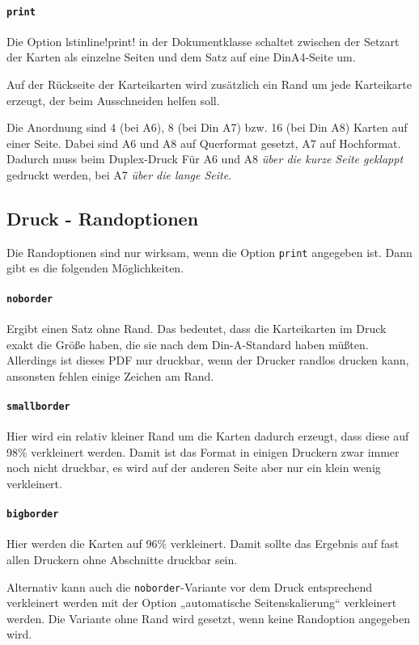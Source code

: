 \documentclass[a4paper]{article}
\begin{document}
\paragraph{\lstinline!print!} Die Option lstinline!print! in der Dokumentklasse schaltet zwischen der Setzart der Karten als einzelne Seiten und dem Satz auf eine DinA4-Seite um.

Auf der Rückseite der Karteikarten wird zusätzlich ein Rand um jede Karteikarte erzeugt, der beim Ausschneiden helfen soll.

Die Anordnung sind 4 (bei A6), 8 (bei Din A7) bzw. 16 (bei Din A8) Karten auf einer Seite. Dabei sind A6 und A8 auf Querformat gesetzt, A7 auf Hochformat. Dadurch muss beim Duplex-Druck Für A6 und A8 \emph{über die kurze Seite geklappt} gedruckt werden, bei A7 \emph{über die lange Seite}.
\subsection{Druck - Randoptionen}
Die Randoptionen sind nur wirksam, wenn die Option \lstinline!print! angegeben ist. Dann gibt es die folgenden Möglichkeiten. 
\paragraph{\lstinline!noborder!} Ergibt einen Satz ohne Rand. Das bedeutet, dass die Karteikarten im Druck exakt die Größe haben, die sie nach dem Din-A-Standard haben müßten. Allerdings ist dieses PDF nur druckbar, wenn der Drucker randlos drucken kann, ansonsten fehlen einige Zeichen am Rand.
\paragraph{\lstinline!smallborder!} Hier wird ein relativ kleiner Rand um die Karten dadurch erzeugt, dass diese auf 98\% verkleinert werden. Damit ist das Format in einigen Druckern zwar immer noch nicht druckbar, es wird auf der anderen Seite aber nur ein klein wenig verkleinert. 
\paragraph{\lstinline!bigborder!} Hier werden die Karten auf 96\% verkleinert. Damit sollte das Ergebnis auf fast allen Druckern ohne Abschnitte druckbar sein.

Alternativ kann auch die \lstinline!noborder!-Variante vor dem Druck entsprechend verkleinert werden mit der Option „automatische Seitenskalierung“ verkleinert werden. Die Variante ohne Rand wird gesetzt, wenn keine Randoption angegeben wird.
\end{document}
